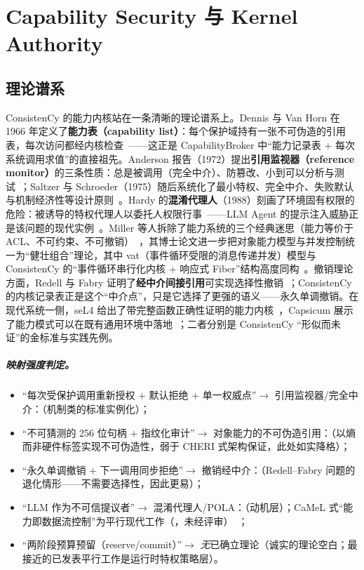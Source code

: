 \chapter{Capability Security 与 Kernel Authority}\label{ch:security}

\section{理论谱系}

ConsistenCy 的能力内核站在一条清晰的理论谱系上。Dennis 与 Van Horn 在 1966 年定义了\textbf{能力表（capability list）}：每个保护域持有一张不可伪造的引用表，每次访问都经内核检查~\cite{dennis1966}——这正是 CapabilityBroker 中“能力记录表 + 每次系统调用求值”的直接祖先。Anderson 报告（1972）提出\textbf{引用监视器（reference monitor）}的三条性质：总是被调用（完全中介）、防篡改、小到可以分析与测试~\cite{anderson1972}；Saltzer 与 Schroeder（1975）随后系统化了最小特权、完全中介、失败默认与机制经济性等设计原则~\cite{saltzer1975}。Hardy 的\textbf{混淆代理人}（1988）刻画了环境固有权限的危险：被诱导的特权代理人以委托人权限行事~\cite{hardy1988}——LLM Agent 的提示注入威胁正是该问题的现代实例~\cite{debenedetti2025}。Miller 等人拆除了能力系统的三个经典迷思（能力等价于 ACL、不可约束、不可撤销）~\cite{miller2003}，其博士论文进一步把对象能力模型与并发控制统一为“健壮组合”理论，其中 vat（事件循环受限的消息传递并发）模型与 ConsistenCy 的“事件循环串行化内核 + 响应式 Fiber”结构高度同构~\cite{miller2006}。撤销理论方面，Redell 与 Fabry 证明了\textbf{经中介间接引用}可实现选择性撤销~\cite{redell1974}；ConsistenCy 的内核记录表正是这个“中介点”，只是它选择了更强的语义——永久单调撤销。在现代系统一侧，seL4 给出了带完整函数正确性证明的能力内核~\cite{klein2009}，Capsicum 展示了能力模式可以在既有通用环境中落地~\cite{watson2010}；二者分别是 ConsistenCy “形似而未证”的金标准与实践先例。

\paragraph{映射强度判定。}
\begin{itemize}[itemsep=0.05em]
  \item “每次受保护调用重新授权 + 默认拒绝 + 单一权威点”$\rightarrow$ 引用监视器/完全中介：\DIRECT{}（机制类的标准实例化）；
  \item “不可猜测的 256 位句柄 + 指纹化审计”$\rightarrow$ 对象能力的不可伪造引用：\DIRECT{}（以熵而非硬件标签实现不可伪造性，弱于 CHERI 式架构保证，此处如实降格）；
  \item “永久单调撤销 + 下一调用同步拒绝”$\rightarrow$ 撤销经中介：\DIRECT{}（Redell--Fabry 问题的退化情形——不需要选择性，因此更易）；
  \item “LLM 作为不可信提议者”$\rightarrow$ 混淆代理人/POLA：\DIRECT{}（动机层）；CaMeL 式“能力即数据流控制”为平行现代工作（\STRONG，未经评审）~\cite{debenedetti2025}；
  \item “两阶段预算预留（reserve/commit）”$\rightarrow$ \emph{无}已确立理论（诚实的理论空白；最接近的已发表平行工作是运行时特权策略层）。
\end{itemize}

